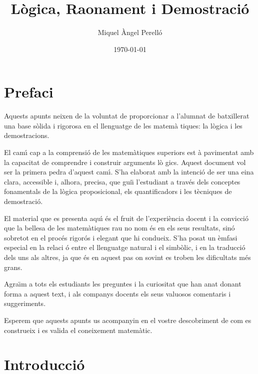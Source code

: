 \documentclass[12pt,a4paper,oneside]{book}
\theoremstyle{plain}
\theoremstyle{definition}
\theoremstyle{remark}
\numberwithin{equation}{section}
\begin{document}
\pagecolor{fons!20}
\frontmatter
\title{Lògica, Raonament i Demostració}
\author{Miquel Àngel Perelló}
\date{\today}
\maketitle
\tableofcontents



\let\cleardoublepage\clearpage

\chapter*{Prefaci}

Aquests apunts neixen de la voluntat de proporcionar a l'alumnat de
batxillerat una base s\`{o}lida i rigorosa en el llenguatge de les matem\`{a}%
tiques: la l\`{o}gica i les demostracions.

El cam\'{\i} cap a la comprensi\'{o} de les matem\`{a}tiques superiors est%
\`{a} pavimentat amb la capacitat de comprendre i construir arguments l\`{o}%
gics. Aquest document vol ser la primera pedra d'aquest cam\'{\i}. S'ha
elaborat amb la intenci\'{o} de ser una eina clara, accessible i, alhora,
precisa, que gui\"{\i} l'estudiant a trav\'{e}s dels conceptes fonamentals
de la l\`{o}gica proposicional, els quantificadors i les t\`{e}cniques de
demostraci\'{o}.

El material que es presenta aqu\'{\i} \'{e}s el fruit de l'experi\`{e}ncia
docent i la convicci\'{o} que la bellesa de les matem\`{a}tiques rau no nom%
\'{e}s en els seus resultats, sin\'{o} sobretot en el proc\'{e}s rigor\'{o}s
i elegant que hi condueix. S'ha posat un \`{e}mfasi especial en la relaci%
\'{o} entre el llenguatge natural i el simb\`{o}lic, i en la traducci\'{o}
dels uns als altres, ja que \'{e}s en aquest pas on sovint es troben les dificultats
m\'{e}s grans.

Agra\"{\i}m a tots els estudiants les preguntes i la curiositat que han
anat donant forma a aquest text, i als companys docents els seus valuosos
comentaris i suggeriments.

Esperem que aquests apunts us acompanyin en el vostre descobriment de com es
construeix i es valida el coneixement matem\`{a}tic.

\let\cleardoublepage\clearpage

\chapter{Introducci\'{o}}
\end{document}

